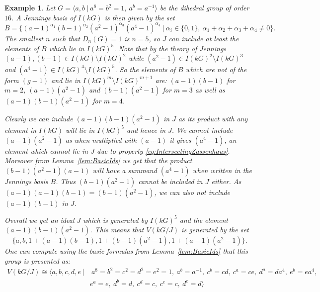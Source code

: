 \documentclass[11pt, a4paper]{amsart}
\newtheorem{example}[theorem]{Example}
\theoremstyle{definition}
\begin{document}
\begin{example}
Let $G = \langle a,b \ | \ a^8 = b^2 = 1, \ a^b = a^{-1} \rangle$ be the dihedral group of order $16$. A Jennings basis of $I(kG)$ is then given by the set
\[B = \{(a-1)^{\alpha_1}(b-1)^{\alpha_2}(a^2-1)^{\alpha_3}(a^4-1)^{\alpha_4} \ | \ \alpha_i \in  \{0,1\}, \ \alpha_1 + \alpha_2 + \alpha_3 + \alpha_4 \neq 0 \}. \]
The smallest $n$ such that $D_n(G) = 1$ is $n = 5$, so $J$ can include at least the elements of $B$ which lie in $I(kG)^5$. Note that by the theory of Jennings $(a-1), (b-1) \in I(kG) \setminus I(kG)^2$ while $(a^2-1) \in I(kG)^2\setminus I(kG)^3$ and $(a^4-1) \in I(kG)^4 \setminus I(kG)^5$. So the elements of $B$ which are not of the form $(g-1)$ and lie in $I(kG)^m\setminus I(kG)^{m+1}$ are: $(a-1)(b-1)$ for $m = 2$, $(a-1)(a^2-1)$ and $(b-1)(a^2-1)$ for $m = 3$ as well as $(a-1)(b-1)(a^2-1)$ for $m = 4$. 

Clearly we can include $(a-1)(b-1)(a^2-1)$ in $J$ as its product with any element in $I(kG)$ will lie in $I(kG)^5$ and hence in $J$. We cannot include $(a-1)(a^2-1)$ as when multiplied with $(a-1)$ it gives $(a^4-1)$, an element which cannot lie in $J$ due to property \eqref{eq:IntersectingZassenhaus}. Moreover from Lemma~\ref{lem:BasicIds} we get that the product $(b-1)(a^2-1)(a-1)$ will have a summand $(a^4-1)$ when written in the Jennings basis $B$. Thus $(b-1)(a^2-1)$ cannot be included in $J$ either. As $(a-1)(a-1)(b-1) = (b-1)(a^2-1)$, we can also not include $(a-1)(b-1)$ in $J$.

Overall we get an ideal $J$ which is generated by $I(kG)^5$ and the element $(a-1)(b-1)(a^2-1)$. This means that $V(kG/J)$ is generated by the set 
\[\{a,b, 1 + (a-1)(b-1), 1+ (b-1)(a^2-1), 1 + (a-1)(a^2-1)  \}.\]
One can compute using the basic formulas from Lemma~\ref{lem:BasicIds} that this group is presented as:
\begin{align*}
V(kG/J) \cong \langle a,b,c,d,e \ |& \ a^8= b^2 = c^2 = d^2 = e^2 = 1, \ a^b = a^{-1}, \ c^b = cd, \ c^a = ce , \ d^a = da^4, \ e^b = ea^4, \\
                      & e^a = e, \ d^b = d, \ c^d = c, \ c^e = c, \ d^e = d   \rangle 
\end{align*}
\end{example}
\end{document}
